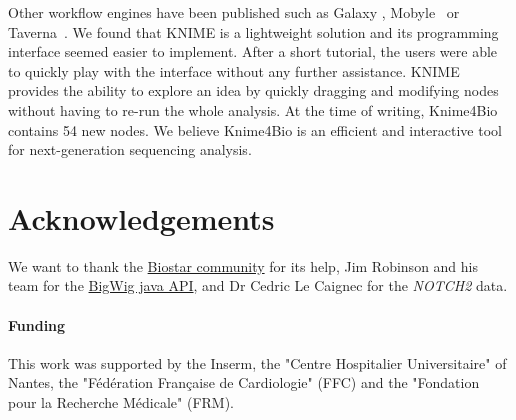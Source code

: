 \documentclass{bioinfo}
\begin{document}
Other workflow engines have been published such as Galaxy \citep{pmid21531983}, Mobyle~\citep{pmid19689959} or Taverna~\citep{pmid16845108}. We found that KNIME is a lightweight solution and its programming interface seemed easier to implement. After a short tutorial, the users were able to quickly play with the interface without any further assistance. KNIME provides the ability to explore an idea by quickly dragging and modifying nodes without having to re-run the whole analysis. At the time of writing, Knime4Bio contains 54 new nodes. We believe Knime4Bio is an efficient and interactive tool for next-generation sequencing analysis.


\section*{Acknowledgements}
We want to thank the  \href{http://biostar.stackexchange.com/}{Biostar community} for its help, Jim Robinson and his team for the \href{http://code.google.com/p/bigwig/}{BigWig java API}, and Dr Cedric Le Caignec for the \textit{NOTCH2} data.

\paragraph{Funding\textcolon} This work was supported by the Inserm, the "Centre Hospitalier Universitaire" of Nantes, the "F\'{e}d\'{e}ration Fran\c{c}aise de Cardiologie" (FFC) and the "Fondation pour la Recherche M\'{e}dicale" (FRM).
\\



\end{document}

